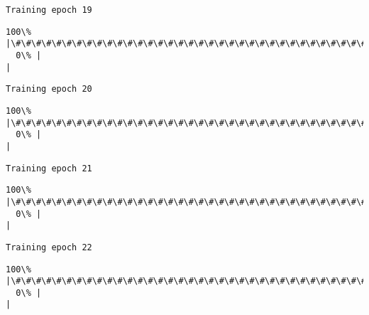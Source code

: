 \documentclass[11pt]{article}
\begin{document}
    \begin{Verbatim}[commandchars=\\\{\}]
Training epoch 19

    \end{Verbatim}

    \begin{Verbatim}[commandchars=\\\{\}]
100\% |\#\#\#\#\#\#\#\#\#\#\#\#\#\#\#\#\#\#\#\#\#\#\#\#\#\#\#\#\#\#\#\#\#\#\#\#\#\#\#\#\#\#\#\#\#\#\#\#\#\#\#\#\#\#\#\#\#\#\#\#\#\#\#\#\#\#\#\#\#\#\#\#|
  0\% |                                                                        |
    \end{Verbatim}

    \begin{Verbatim}[commandchars=\\\{\}]
Training epoch 20

    \end{Verbatim}

    \begin{Verbatim}[commandchars=\\\{\}]
100\% |\#\#\#\#\#\#\#\#\#\#\#\#\#\#\#\#\#\#\#\#\#\#\#\#\#\#\#\#\#\#\#\#\#\#\#\#\#\#\#\#\#\#\#\#\#\#\#\#\#\#\#\#\#\#\#\#\#\#\#\#\#\#\#\#\#\#\#\#\#\#\#\#|
  0\% |                                                                        |
    \end{Verbatim}

    \begin{Verbatim}[commandchars=\\\{\}]
Training epoch 21

    \end{Verbatim}

    \begin{Verbatim}[commandchars=\\\{\}]
100\% |\#\#\#\#\#\#\#\#\#\#\#\#\#\#\#\#\#\#\#\#\#\#\#\#\#\#\#\#\#\#\#\#\#\#\#\#\#\#\#\#\#\#\#\#\#\#\#\#\#\#\#\#\#\#\#\#\#\#\#\#\#\#\#\#\#\#\#\#\#\#\#\#|
  0\% |                                                                        |
    \end{Verbatim}

    \begin{Verbatim}[commandchars=\\\{\}]
Training epoch 22

    \end{Verbatim}

    \begin{Verbatim}[commandchars=\\\{\}]
100\% |\#\#\#\#\#\#\#\#\#\#\#\#\#\#\#\#\#\#\#\#\#\#\#\#\#\#\#\#\#\#\#\#\#\#\#\#\#\#\#\#\#\#\#\#\#\#\#\#\#\#\#\#\#\#\#\#\#\#\#\#\#\#\#\#\#\#\#\#\#\#\#\#|
  0\% |                                                                        |
    \end{Verbatim}
\end{document}
